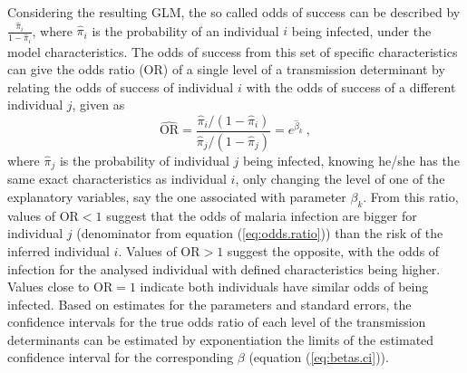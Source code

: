 Considering the resulting GLM, the so called odds of success can be described by $\textstyle\frac{\hat{\pi}_{i}}{1-\hat{\pi}_{i}}$, where $\hat{\pi}_{i}$ is the probability of an individual $i$ being infected, under the model characteristics.
The odds of success from this set of specific characteristics can give the odds ratio (OR) of a single level of a transmission determinant by relating the odds of success of individual $i$ with the odds of success of a different individual $j$, given as
%
\begin{equation}
\label{eq:odds.ratio}
    \hat{\text{OR}} = \frac{\hat{\pi}_i/\left(1-\hat{\pi}_i\right)}{\hat{\pi}_j/\left(1-\hat{\pi}_j\right)}= e^{\hat{\beta}_k}\ ,
\end{equation}
%
\noindent
where $\hat{\pi}_j$ is the probability of individual $j$ being infected, knowing he/she has the same exact characteristics as individual $i$, only changing the level of one of the explanatory variables, say the one associated with parameter $\beta_k$.
From this ratio, values of $\text{OR}<1$ suggest that the odds of malaria infection are bigger for individual $j$ (denominator from equation (\ref{eq:odds.ratio})) than the risk of the inferred individual $i$.
Values of $\text{OR}>1$ suggest the opposite, with the odds of infection for the analysed individual with defined characteristics being higher.
Values close to $\text{OR}=1$ indicate both individuals have similar odds of being infected.
Based on estimates for the parameters and standard errors, the confidence intervals for the true odds ratio of each level of the transmission determinants can be estimated by exponentiation the limits of the estimated confidence interval for the corresponding $\beta$ (equation (\ref{eq:betas.ci})).
%

